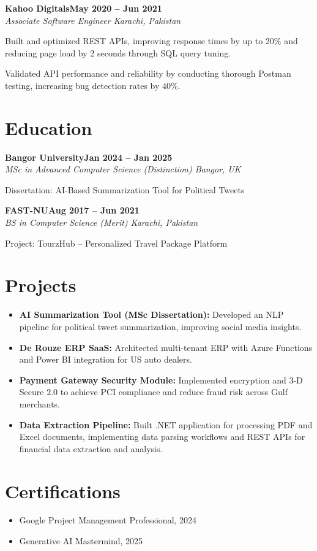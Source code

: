 \documentclass[letterpaper,10pt]{article}
\newcommand{\headingBf}[2]{
  \hspace{10pt}\textbf{#1}\hfill\textbf{#2}\\
}
\newcommand{\headingIt}[2]{
  \hspace{10pt}\textit{#1}\hfill\textit{#2}\\
}
\newenvironment{resume_list}{
  \vspace{-7pt}
  \begin{itemize}[itemsep=-2px, parsep=1pt, leftmargin=30pt]
}{
  \end{itemize}
}
\begin{document}
\headingBf{Kahoo Digitals}{May 2020 -- Jun 2021}
\headingIt{Associate Software Engineer \hfill Karachi, Pakistan}{}
\begin{resume_list}
    \item Built and optimized REST APIs, improving response times by up to 20\% and reducing page load by 2 seconds through SQL query tuning.
    \item Validated API performance and reliability by conducting thorough Postman testing, increasing bug detection rates by 40\%.
\end{resume_list}

\section{Education}

\headingBf{Bangor University}{Jan 2024 -- Jan 2025}
\headingIt{MSc in Advanced Computer Science (Distinction) \hfill Bangor, UK}{}
\begin{resume_list}
    \item Dissertation: AI-Based Summarization Tool for Political Tweets
\end{resume_list}

\headingBf{FAST-NU}{Aug 2017 -- Jun 2021}
\headingIt{BS in Computer Science (Merit) \hfill Karachi, Pakistan}{}
\begin{resume_list}
    \item Project: TourzHub -- Personalized Travel Package Platform
\end{resume_list}

\section{Projects}
\begin{itemize}
    \setlength\itemsep{3pt}
    \item \textbf{AI Summarization Tool (MSc Dissertation):} Developed an NLP pipeline for political tweet summarization, improving social media insights.
    \item \textbf{De Rouze ERP SaaS:} Architected multi-tenant ERP with Azure Functions and Power BI integration for US auto dealers.
    \item \textbf{Payment Gateway Security Module:} Implemented encryption and 3-D Secure 2.0 to achieve PCI compliance and reduce fraud risk across Gulf merchants.
    \item \textbf{Data Extraction Pipeline:} Built .NET application for processing PDF and Excel documents, implementing data parsing workflows and REST APIs for financial data extraction and analysis.
\end{itemize}

\section{Certifications}
\begin{itemize}
    \item Google Project Management Professional, 2024
    \item Generative AI Mastermind, 2025
\end{itemize}

\vspace*{\fill}
\end{document}
